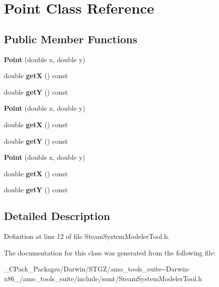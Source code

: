 \hypertarget{class_point}{}\section{Point Class Reference}
\label{class_point}
\subsection*{Public Member Functions}
\begin{DoxyCompactItemize}
\item 
\mbox{\label{class_point_a78b55e8d5466bb8c2cf60fa55f2562ff}} 
{\bfseries Point} (double x, double y)
\item 
\mbox{\label{class_point_a655794dd595a4821987664bf1d9010e8}} 
double {\bfseries getX} () const
\item 
\mbox{\label{class_point_aa323a12bec85e28ce6575dccec4f8b28}} 
double {\bfseries getY} () const
\item 
\mbox{\label{class_point_a78b55e8d5466bb8c2cf60fa55f2562ff}} 
{\bfseries Point} (double x, double y)
\item 
\mbox{\label{class_point_a655794dd595a4821987664bf1d9010e8}} 
double {\bfseries getX} () const
\item 
\mbox{\label{class_point_aa323a12bec85e28ce6575dccec4f8b28}} 
double {\bfseries getY} () const
\item 
\mbox{\label{class_point_a78b55e8d5466bb8c2cf60fa55f2562ff}} 
{\bfseries Point} (double x, double y)
\item 
\mbox{\label{class_point_a655794dd595a4821987664bf1d9010e8}} 
double {\bfseries getX} () const
\item 
\mbox{\label{class_point_aa323a12bec85e28ce6575dccec4f8b28}} 
double {\bfseries getY} () const
\end{DoxyCompactItemize}


\subsection{Detailed Description}


Definition at line 12 of file Steam\+System\+Modeler\+Tool.\+h.



The documentation for this class was generated from the following file\+:\begin{DoxyCompactItemize}
\item 
\+\_\+\+C\+Pack\+\_\+\+Packages/\+Darwin/\+S\+T\+G\+Z/amo\+\_\+tools\+\_\+suite-\/-\/\+Darwin-\/x86\+\_/amo\+\_\+tools\+\_\+suite/include/ssmt/Steam\+System\+Modeler\+Tool.\+h\end{DoxyCompactItemize}
